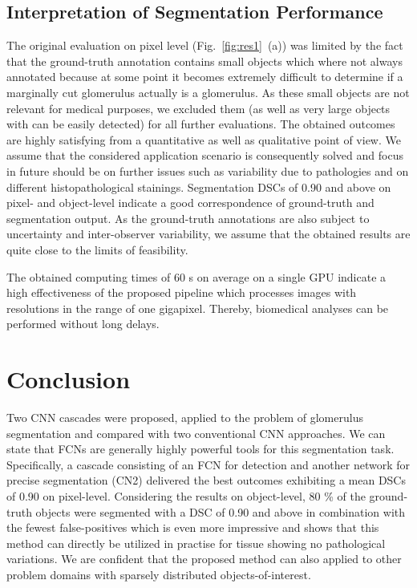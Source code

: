 \documentclass{elsarticle}
\begin{document}
\subsection{Interpretation of Segmentation Performance}
The original evaluation on pixel level (Fig.~\ref{fig:res1}~(a)) was limited by the fact that the ground-truth annotation contains small objects which where not always annotated because at some point it becomes extremely difficult to determine if a marginally cut glomerulus actually is a glomerulus. As these small objects are not relevant for medical purposes, we excluded them (as well as very large objects with can be easily detected) for all further evaluations. The obtained outcomes are highly satisfying from a quantitative as well as qualitative point of view. We assume that the considered application scenario is consequently solved and focus in future should be on further issues such as variability due to pathologies and on different histopathological stainings.
Segmentation DSCs of 0.90 and above on pixel- and object-level indicate a good correspondence of ground-truth and segmentation output. As the ground-truth annotations are also subject to uncertainty and inter-observer variability, we assume that the obtained results are quite close to the limits of feasibility.

The obtained computing times of 60 s on average on a single GPU indicate a high effectiveness of the proposed pipeline which processes images with resolutions in the range of one gigapixel. Thereby, biomedical analyses can be performed without long delays.

\section{Conclusion}
Two CNN cascades were proposed, applied to the problem of glomerulus segmentation and compared with two conventional CNN approaches.
We can state that FCNs are generally highly powerful tools for this segmentation task. 
Specifically, a cascade consisting of an FCN for detection and another network for precise segmentation (CN2) delivered the best outcomes exhibiting a mean DSCs of 0.90 on pixel-level. Considering the results on object-level, 80 \% of the ground-truth objects were segmented with a DSC of 0.90 and above in combination with the fewest false-positives which is even more impressive and shows that this method can directly be utilized in practise for tissue showing no pathological variations.
We are confident that the proposed method can also applied to other problem domains with sparsely distributed objects-of-interest.
\end{document}
